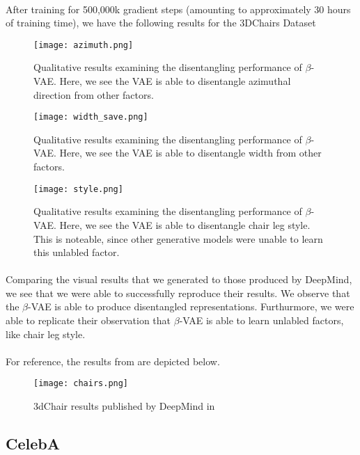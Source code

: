 \documentclass[justified,nobib]{tufte-handout}
\begin{document}
\begin{fullwidth}
\paragraph{} After training for 500,000k gradient steps (amounting to approximately 30 hours of training time), we have the following results for the 3DChairs Dataset
\begin{figure}
\centering
\label{azi}
\texttt{[image: azimuth.png]}
\caption{Qualitative results examining the disentangling performance of $\beta$-VAE. Here, we see the VAE is able to disentangle azimuthal direction from other factors.} 
\end{figure}
\begin{figure}
\centering
\label{width}
\texttt{[image: width\_save.png]}
\caption{Qualitative results examining the disentangling performance of $\beta$-VAE. Here, we see the VAE is able to disentangle width from other factors.} 
\end{figure}
\begin{figure}
\centering
\label{style}
\texttt{[image: style.png]}
\caption{Qualitative results examining the disentangling performance of $\beta$-VAE. Here, we see the VAE is able to disentangle chair leg style. This is noteable, since other generative models were unable to learn this unlabled factor.} 
\end{figure}
\paragraph{} Comparing the visual results that we generated to those produced by DeepMind, we see that we were able to successfully reproduce their results. We observe that the $\beta$-VAE is able to produce disentangled representations. Furthurmore, we were able to replicate their observation that $\beta$-VAE is able to learn unlabled factors, like chair leg style. 
\clearpage
\paragraph{} For reference, the results from \cite{bvae} are depicted below.
\begin{figure}
\centering
\label{bvae}
\texttt{[image: chairs.png]}
\caption{3dChair results published by DeepMind in \cite{bvae}} 
\end{figure}
\clearpage
\subsection{CelebA}

\end{fullwidth}
\end{document}
